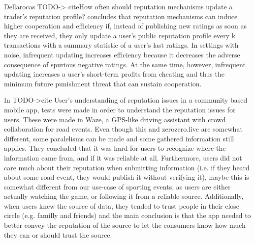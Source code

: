 Dellarocas TODO-> cite{How often should reputation mechanisms update a trader's reputation profile?} concludes that reputation mechanisms can induce higher cooperation and efficiency if, instead of publishing new ratings as soon as they are received, they only update a user's public reputation profile every k transactions with a summary statistic of a user's last ratings. In settings with noise, infrequent updating increases efficiency because it decreases the adverse consequence of spurious negative ratings. At the same time, however, infrequent updating increases a user's short-term profits from cheating and thus the minimum future punishment threat that can sustain cooperation.

In TODO->cite {User’s understanding of reputation issues in a community based mobile app}, tests were made in order to understand the reputation issues for users. These were made in Waze, a GPS-like driving assistant with crowd collaboration for road events. Even though this and zerozero.live are somewhat different, some paralelisms can be made and some gathered information still applies. They concluded that it was hard for users to recognize where the information came from, and if it was reliable at all. Furthermore, users did not care much about their reputation when submitting information (i.e. if they heard about some road event, they would publish it without verifying it), maybe this is somewhat different from our use-case of sporting events, as users are either actually watching the game, or following it from a reliable source. Additionally, when users knew the source of data, they tended to trust people in their close circle (e.g. familly and friends) and the main conclusion is that the app needed to better convey the reputation of the source to let the consumers know how much they can or should trust the source.

